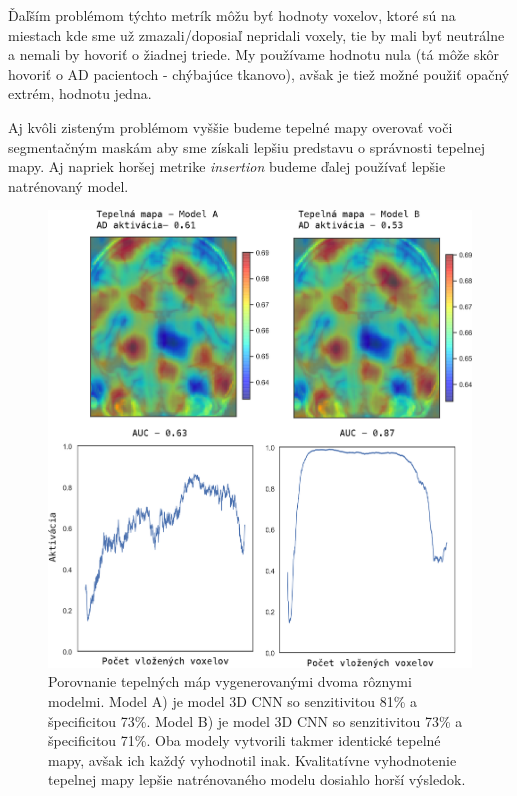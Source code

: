 Ďaľším problémom týchto metrík môžu byť hodnoty voxelov, ktoré sú na miestach kde sme už zmazali/doposiaľ nepridali voxely, tie by mali byť neutrálne a nemali by hovoriť o žiadnej triede. My používame hodnotu nula (tá môže skôr hovoriť o AD pacientoch - chýbajúce tkanovo), avšak je tiež možné použiť opačný extrém, hodnotu jedna.

Aj kvôli zisteným problémom vyššie budeme tepelné mapy overovať voči segmentačným maskám aby sme získali lepšiu predstavu o správnosti tepelnej mapy. Aj napriek horšej metrike \textit{insertion} budeme ďalej používať lepšie natrénovaný model.

\begin{figure}[h!]
    \centering
    \includegraphics[width=14cm]{assets/images/3d_cnn_heatmap_cmp.png}
    \caption{Porovnanie tepelných máp vygenerovanými dvoma rôznymi modelmi. Model A) je model 3D CNN so senzitivitou 81\% a špecificitou 73\%. Model B) je model 3D CNN so senzitivitou 73\% a špecificitou 71\%. Oba modely vytvorili takmer identické tepelné mapy, avšak ich každý vyhodnotil inak. Kvalitatívne vyhodnotenie tepelnej mapy lepšie natrénovaného modelu dosiahlo horší výsledok.}
    \label{fig:3d_cnn_heatmap_cmp}
\end{figure}

